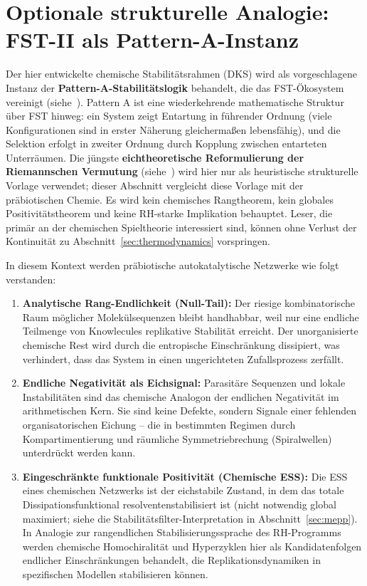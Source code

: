 \documentclass[12pt,a4paper]{article}
\theoremstyle{remark}
\begin{document}
\section[Optionale strukturelle Analogie: FST-II als Pattern-A-Instanz]{Optionale strukturelle Analogie:\protect\\FST-II als Pattern-A-Instanz}
\label{sec:structural-alignment}

Der hier entwickelte chemische Stabilitätsrahmen (DKS) wird als vorgeschlagene Instanz der \textbf{Pattern-A-Stabilitätslogik} behandelt, die das FST-Ökosystem vereinigt (siehe~\cite{FST-Unified2026}). Pattern A ist eine wiederkehrende mathematische Struktur über FST hinweg: ein System zeigt Entartung in führender Ordnung (viele Konfigurationen sind in erster Näherung gleichermaßen lebensfähig), und die Selektion erfolgt in zweiter Ordnung durch Kopplung zwischen entarteten Unterräumen. Die jüngste \textbf{eichtheoretische Reformulierung der Riemannschen Vermutung} (siehe~\cite{GeigerRH2026c}) wird hier nur als heuristische strukturelle Vorlage verwendet; dieser Abschnitt vergleicht diese Vorlage mit der präbiotischen Chemie. Es wird kein chemisches Rangtheorem, kein globales Positivitätstheorem und keine RH-starke Implikation behauptet. Leser, die primär an der chemischen Spieltheorie interessiert sind, können ohne Verlust der Kontinuität zu Abschnitt~\ref{sec:thermodynamics} vorspringen.

In diesem Kontext werden präbiotische autokatalytische Netzwerke wie folgt verstanden:
\begin{enumerate}[label=\alph*)]
    \item \textbf{Analytische Rang-Endlichkeit (Null-Tail):} Der riesige kombinatorische Raum möglicher Molekülsequenzen bleibt handhabbar, weil nur eine endliche Teilmenge von \glqq Knowlecules\grqq{} replikative Stabilität erreicht. Der unorganisierte chemische Rest wird durch die entropische Einschränkung dissipiert, was verhindert, dass das System in einen ungerichteten Zufallsprozess zerfällt.
    \item \textbf{Endliche Negativität als Eichsignal:} Parasitäre Sequenzen und lokale Instabilitäten sind das chemische Analogon der endlichen Negativität im arithmetischen Kern. Sie sind keine Defekte, sondern Signale einer fehlenden organisatorischen Eichung -- die in bestimmten Regimen durch Kompartimentierung und räumliche Symmetriebrechung (Spiralwellen) unterdrückt werden kann.
    \item \textbf{Eingeschränkte funktionale Positivität (Chemische ESS):} Die ESS eines chemischen Netzwerks ist der \glqq eichstabile\grqq{} Zustand, in dem das totale Dissipationsfunktional resolventenstabilisiert ist (nicht notwendig global maximiert; siehe die Stabilitätsfilter-Interpretation in Abschnitt~\ref{sec:mepp}). In Analogie zur rangendlichen Stabilisierungssprache des RH-Programms werden chemische Homochiralität und Hyperzyklen hier als Kandidatenfolgen endlicher Einschränkungen behandelt, die Replikationsdynamiken in spezifischen Modellen stabilisieren können.
\end{enumerate}
\end{document}
